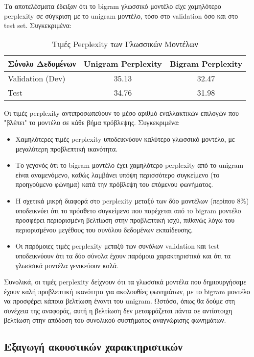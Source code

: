 \documentclass[a4paper,12pt]{article}
\begin{document}
Τα αποτελέσματα έδειξαν ότι το bigram γλωσσικό μοντέλο είχε χαμηλότερο perplexity σε σύγκριση με το unigram μοντέλο, τόσο στο validation όσο και στο test set. Συγκεκριμένα:

\begin{table}[h]
\centering
\caption{Τιμές Perplexity των Γλωσσικών Μοντέλων}
\label{tab:perplexity}
\begin{tabular}{@{}lcc@{}}
\toprule
\textbf{Σύνολο Δεδομένων} & \textbf{Unigram Perplexity} & \textbf{Bigram Perplexity} \\
\midrule
Validation (Dev) & 35.13 & 32.47 \\
Test & 34.76 & 31.98 \\
\bottomrule
\end{tabular}
\end{table}

Οι τιμές perplexity αντιπροσωπεύουν το μέσο αριθμό εναλλακτικών επιλογών που "βλέπει" το μοντέλο σε κάθε βήμα πρόβλεψης. Συγκεκριμένα:

\begin{itemize}
    \item Χαμηλότερες τιμές perplexity υποδεικνύουν καλύτερο γλωσσικό μοντέλο, με μεγαλύτερη προβλεπτική ικανότητα.
    \item Το γεγονός ότι το bigram μοντέλο έχει χαμηλότερο perplexity από το unigram είναι αναμενόμενο, καθώς λαμβάνει υπόψη περισσότερο συγκείμενο (το προηγούμενο φώνημα) κατά την πρόβλεψη του επόμενου φωνήματος.
    \item Η σχετικά μικρή διαφορά στο perplexity μεταξύ των δύο μοντέλων (περίπου 8\%) υποδεικνύει ότι το πρόσθετο συγκείμενο που παρέχεται από το bigram μοντέλο προσφέρει περιορισμένη βελτίωση στην προβλεπτική ισχύ, πιθανώς λόγω του περιορισμένου μεγέθους του συνόλου δεδομένων εκπαίδευσης.
    \item Οι παρόμοιες τιμές perplexity μεταξύ των συνόλων validation και test υποδεικνύουν ότι τα δύο σύνολα έχουν παρόμοια χαρακτηριστικά και ότι τα γλωσσικά μοντέλα γενικεύουν καλά.
\end{itemize}

Συνολικά, οι τιμές perplexity δείχνουν ότι τα γλωσσικά μοντέλα που δημιουργήσαμε έχουν καλή προβλεπτική ικανότητα για ακολουθίες φωνημάτων, με το bigram μοντέλο να προσφέρει κάποια βελτίωση έναντι του unigram. Ωστόσο, όπως θα δούμε στη συνέχεια της αναφοράς, αυτή η βελτίωση δεν μεταφράζεται πάντα σε αντίστοιχη βελτίωση στην απόδοση του συνολικού συστήματος αναγνώρισης φωνημάτων.

\subsection{Εξαγωγή ακουστικών χαρακτηριστικών}
\end{document}
